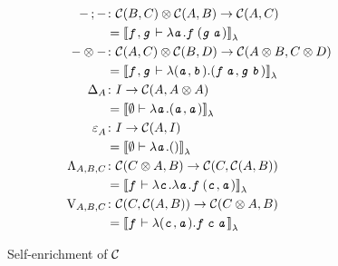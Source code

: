 \documentclass[runningheads,envcountsame]{llncs}
\begin{document}
    \begin{figure}
        \begin{align*}
            \comp{-}{-} & \colon \tensor{\homC{B}{C}}{\homC{A}{B}} \to \homC{A}{C} \\
                        & = \semL{\evar{f}, \evar{g} \vdash \elam{\evar{a}}{\eapp{\evar{f}}{(\eapp{\evar{g}}{\evar{a}})}}} \\
            \tensor{-}{-} & \colon \tensor{\homC{A}{C}}{\homC{B}{D}} \to \homC{\tensor{A}{B}}{\tensor{C}{D}} \\
                          & = \semL{\evar{f}, \evar{g} \vdash \elam{\epair{\evar{a}}{\evar{b}}}{\epair{\eapp{\evar{f}}{\evar{a}}}{\eapp{\evar{g}}{\evar{b}}}}} \\
            \Delta_A & \colon I \to \homC{A}{\tensor{A}{A}} \\
                     & = \semL{\emptyset \vdash \elam{\evar{a}}{\epair{\evar{a}}{\evar{a}}}} \\
            \terminal_A & \colon I \to \homC{A}{I} \\
                        & = \semL{\emptyset \vdash \elam{\evar{a}}{\eunit}} \\
            \curry_{A,B,C} & \colon \homC{\tensor{C}{A}}{B} \to \homC{C}{\homC{A}{B}} \\
                           & = \semL{\evar{f} \vdash \elam{\evar{c}}{\elam{\evar{a}}{\eapp{\evar{f}}{\epair{\evar{c}}{\evar{a}}}}}} \\
            \uncurry_{A,B,C} & \colon \homC{C}{\homC{A}{B}} \to \homC{\tensor{C}{A}}{B} \\
                             & = \semL{\evar{f} \vdash \elam{\epair{\evar{c}}{\evar{a}}}{\eapp{\eapp{\evar{f}}{\evar{c}}}{\evar{a}}}}
        \end{align*}

        \caption{Self-enrichment of $\mathcal{C}$}
        \label{fig:enrichment1}
    \end{figure}
    
\end{document}
